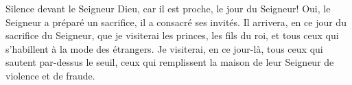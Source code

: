 Silence devant le Seigneur Dieu, car il est proche, le jour du Seigneur!
	Oui, le Seigneur a préparé un sacrifice, il a consacré ses invités.
Il arrivera, en ce jour du sacrifice du Seigneur,
	que je visiterai les princes, les fils du roi,
	et tous ceux qui s’habillent à la mode des étrangers.
Je visiterai, en ce jour-là, tous ceux qui sautent par-dessus le seuil,
	ceux qui remplissent la maison de leur Seigneur de violence et de fraude.
